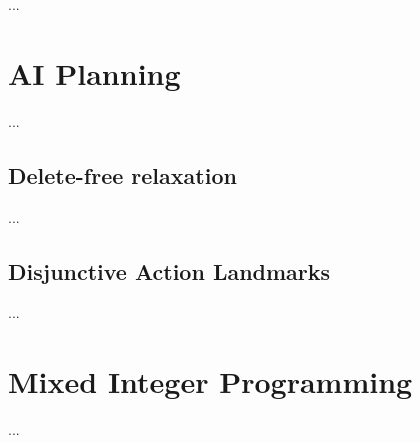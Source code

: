 ...

\section{AI Planning}
...

\subsection{Delete-free relaxation}
...

\subsection{Disjunctive Action Landmarks}
...

\section{Mixed Integer Programming}
...
